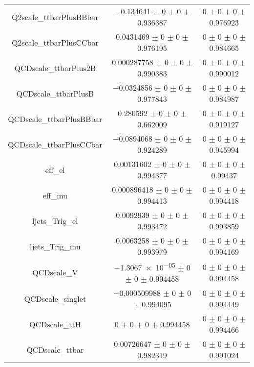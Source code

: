 \begin{table}
\begin{tabular}{ccc}
Q2scale\_ttbarPlusBBbar & \num{-0.134641} $\pm$ \num{0} $\pm$ \num{0} $\pm$ \num{0.936387} & \num{0} $\pm$ \num{0} $\pm$ \num{0} $\pm$ \num{0.976923}\\
Q2scale\_ttbarPlusCCbar & \num{0.0431469} $\pm$ \num{0} $\pm$ \num{0} $\pm$ \num{0.976195} & \num{0} $\pm$ \num{0} $\pm$ \num{0} $\pm$ \num{0.984665}\\
QCDscale\_ttbarPlus2B & \num{0.000287758} $\pm$ \num{0} $\pm$ \num{0} $\pm$ \num{0.990383} & \num{0} $\pm$ \num{0} $\pm$ \num{0} $\pm$ \num{0.990012}\\
QCDscale\_ttbarPlusB & \num{-0.0324856} $\pm$ \num{0} $\pm$ \num{0} $\pm$ \num{0.977843} & \num{0} $\pm$ \num{0} $\pm$ \num{0} $\pm$ \num{0.984987}\\
QCDscale\_ttbarPlusBBbar & \num{0.280592} $\pm$ \num{0} $\pm$ \num{0} $\pm$ \num{0.662009} & \num{0} $\pm$ \num{0} $\pm$ \num{0} $\pm$ \num{0.919127}\\
QCDscale\_ttbarPlusCCbar & \num{-0.0894068} $\pm$ \num{0} $\pm$ \num{0} $\pm$ \num{0.924289} & \num{0} $\pm$ \num{0} $\pm$ \num{0} $\pm$ \num{0.945994}\\
eff\_el & \num{0.00131602} $\pm$ \num{0} $\pm$ \num{0} $\pm$ \num{0.994377} & \num{0} $\pm$ \num{0} $\pm$ \num{0} $\pm$ \num{0.99437}\\
eff\_mu & \num{0.000896418} $\pm$ \num{0} $\pm$ \num{0} $\pm$ \num{0.994413} & \num{0} $\pm$ \num{0} $\pm$ \num{0} $\pm$ \num{0.994418}\\
ljets\_Trig\_el & \num{0.0092939} $\pm$ \num{0} $\pm$ \num{0} $\pm$ \num{0.993472} & \num{0} $\pm$ \num{0} $\pm$ \num{0} $\pm$ \num{0.993859}\\
ljets\_Trig\_mu & \num{0.0063258} $\pm$ \num{0} $\pm$ \num{0} $\pm$ \num{0.993979} & \num{0} $\pm$ \num{0} $\pm$ \num{0} $\pm$ \num{0.994169}\\
QCDscale\_V & \num{-1.3067e-05} $\pm$ \num{0} $\pm$ \num{0} $\pm$ \num{0.994458} & \num{0} $\pm$ \num{0} $\pm$ \num{0} $\pm$ \num{0.994458}\\
QCDscale\_singlet & \num{-0.000509988} $\pm$ \num{0} $\pm$ \num{0} $\pm$ \num{0.994095} & \num{0} $\pm$ \num{0} $\pm$ \num{0} $\pm$ \num{0.994449}\\
QCDscale\_ttH & \num{0} $\pm$ \num{0} $\pm$ \num{0} $\pm$ \num{0.994458} & \num{0} $\pm$ \num{0} $\pm$ \num{0} $\pm$ \num{0.994466}\\
QCDscale\_ttbar & \num{0.00726647} $\pm$ \num{0} $\pm$ \num{0} $\pm$ \num{0.982319} & \num{0} $\pm$ \num{0} $\pm$ \num{0} $\pm$ \num{0.991024}\\

\end{tabular}
\end{table}

